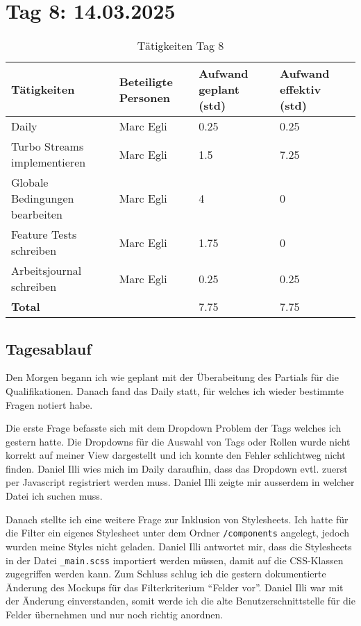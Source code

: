 \section{Tag 8: 14.03.2025}
\begin{table}[H]
    \begin{tabular}{|L{0.4\textwidth}|C{60pt}|C{60pt}|C{60pt}|}
        \hline
        \color{white}Tätigkeiten & \color{white}Beteiligte \color{white}Personen & \color{white}Aufwand geplant (std) & \color{white}Aufwand effektiv (std) \\
        \hline
        Daily & Marc Egli & 0.25 & 0.25 \\
        \hline
        Turbo Streams implementieren & Marc Egli & 1.5 & 7.25 \\
        \hline
        Globale Bedingungen bearbeiten & Marc Egli & 4 & 0 \\
        \hline
        Feature Tests schreiben & Marc Egli & 1.75 & 0 \\
        \hline
        Arbeitsjournal schreiben & Marc Egli & 0.25 & 0.25 \\
        \textbf{Total} &  & 7.75 & 7.75 \\
        \hline
    \end{tabular}
    \caption{Tätigkeiten Tag 8}
\end{table}

\subsection*{Tagesablauf}
Den Morgen begann ich wie geplant mit der Überabeitung des Partials für die Qualifikationen. Danach fand das Daily statt, für welches ich wieder
bestimmte Fragen notiert habe.

Die erste Frage befasste sich mit dem Dropdown Problem der Tags welches ich gestern hatte. Die Dropdowns für die Auswahl von Tags oder Rollen wurde nicht korrekt
auf meiner View dargestellt und ich konnte den Fehler schlichtweg nicht finden. Daniel Illi wies mich im Daily daraufhin, dass
das Dropdown evtl. zuerst per Javascript registriert werden muss. Daniel Illi zeigte mir ausserdem in welcher Datei ich suchen muss.

Danach stellte ich eine weitere Frage zur Inklusion von Stylesheets. Ich hatte für die Filter ein eigenes Stylesheet unter dem Ordner \texttt{/components}
angelegt, jedoch wurden meine Styles nicht geladen. Daniel Illi antwortet mir, dass die Stylesheets in der Datei \texttt{\_main.scss} importiert werden müssen,
damit auf die CSS-Klassen zugegriffen werden kann. Zum Schluss schlug ich die gestern dokumentierte Änderung des Mockups für das Filterkriterium ``Felder vor''.
Daniel Illi war mit der Änderung einverstanden, somit werde ich die alte Benutzerschnittstelle für die Felder übernehmen und nur noch richtig anordnen.


